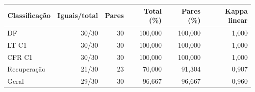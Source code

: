 \begin{tabular}{lrrrrr}
\hline
Classificação & Iguais/total & Pares & Total (\%) & Pares (\%) & Kappa linear \\
\hline
DF & 30/30 & 30 & 100,000 & 100,000 & 1,000 \\
LT C1 & 30/30 & 30 & 100,000 & 100,000 & 1,000 \\
CFR C1 & 30/30 & 30 & 100,000 & 100,000 & 1,000 \\
Recuperação & 21/30 & 23 & 70,000 & 91,304 & 0,907 \\
Geral & 29/30 & 30 & 96,667 & 96,667 & 0,960 \\
\hline
\end{tabular}
